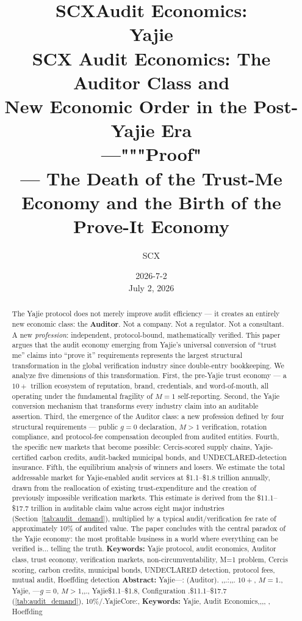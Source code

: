\documentclass[12pt,a4paper]{article}
\title{\textbf{SCXAudit Economics: \\Yajie}\\[8pt]
 \large SCX Audit Economics: The Auditor Class and\\New Economic Order in the Post-Yajie Era\\[6pt]
 \normalsize ---"""Proof"\\[4pt]
 --- The Death of the Trust-Me Economy and the Birth of the Prove-It Economy}
\author{SCX}
\date{2026-7-2 \\ July 2, 2026}
\theoremstyle{remark}
\begin{document}
\maketitle
\begin{abstract}
\noindent
The Yajie protocol does not merely improve audit efficiency --- it creates an entirely new 
economic class: the \textbf{Auditor}. Not a company. Not a regulator. Not a consultant. 
A new \textit{profession}: independent, protocol-bound, mathematically verified. This paper 
argues that the audit economy emerging from Yajie's universal conversion of ``trust me'' 
claims into ``prove it'' requirements represents the largest structural transformation in 
the global verification industry since double-entry bookkeeping.
We analyze five dimensions of this transformation. First, the pre-Yajie trust economy --- 
a $10+$ trillion ecosystem of reputation, brand, credentials, and word-of-mouth, all 
operating under the fundamental fragility of $M=1$ self-reporting. Second, the Yajie 
conversion mechanism that transforms every industry claim into an auditable assertion. 
Third, the emergence of the Auditor class: a new profession defined by four structural 
requirements --- public $g=0$ declaration, $M>1$ verification, rotation compliance, and 
protocol-fee compensation decoupled from audited entities. Fourth, the specific new markets 
that become possible: Cercis-scored supply chains, Yajie-certified carbon credits, 
audit-backed municipal bonds, and UNDECLARED-detection insurance. Fifth, the equilibrium 
analysis of winners and losers.
We estimate the total addressable market for Yajie-enabled audit services at \$1.1–\$1.8
trillion annually, drawn from the reallocation of existing trust-expenditure and the
creation of previously impossible verification markets. This estimate is derived from
the \$11.1–\$17.7 trillion in auditable claim value across eight major industries
(Section~\ref{tab:audit_demand}), multiplied by a typical audit/verification fee rate
of approximately 10\% of audited value. The paper concludes with the central paradox
of the Yajie economy: the most profitable business in a world where everything can be
verified is... telling the truth.
\medskip
\noindent\textbf{Keywords:} Yajie protocol, audit economics, Auditor class, trust economy, 
verification markets, non-circumventability, M=1 problem, Cercis scoring, carbon credits, 
municipal bonds, UNDECLARED detection, protocol fees, mutual audit, Hoeffding detection
\medskip
\noindent\textbf{Abstract: }
Yajie---: (Auditor).
,,.\textit{}:,,.
$10+$, $M=1$., Yajie, 
---$g=0$, $M>1$,,., 
Yajie\$1.1–\$1.8, Configuration
.\$11.1–\$17.7
(\ref{tab:audit_demand}), 10\%/.YajieCore:, 
\medskip
\noindent\textbf{Keywords: } Yajie, Audit Economics,,,, 
, Hoeffding
\end{abstract}
\newpage
\tableofcontents
\newpage
\end{document}
